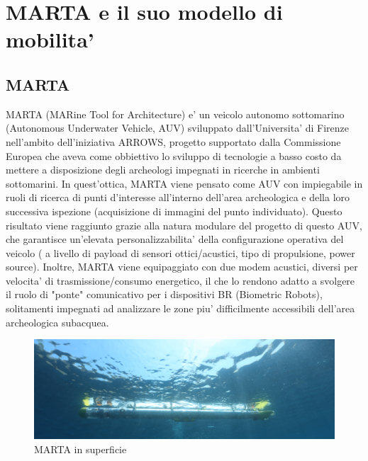 \chapter{MARTA e il suo modello di mobilita'}

\section{MARTA}

MARTA (MARine Tool for Architecture) e' un veicolo autonomo sottomarino (Autonomous Underwater Vehicle, AUV) sviluppato dall'Universita' di Firenze nell'ambito dell'iniziativa ARROWS, progetto supportato dalla Commissione Europea che aveva come obbiettivo lo sviluppo di tecnologie a basso costo da mettere a disposizione degli archeologi impegnati in ricerche in ambienti sottomarini. \newline
In quest'ottica, MARTA viene pensato come AUV con impiegabile in ruoli di ricerca di punti d'interesse all'interno dell'area archeologica e della loro successiva ispezione (acquisizione di immagini del punto individuato). \newline
Questo risultato viene raggiunto grazie alla natura modulare del progetto di questo AUV, che garantisce un'elevata personalizzabilita' della configurazione operativa del veicolo ( a livello di payload di sensori ottici/acustici, tipo di propulsione, power source). \newline
Inoltre, MARTA viene equipaggiato con due modem acustici, diversi per velocita' di trasmissione/consumo energetico, il che lo rendono adatto a svolgere il ruolo di "ponte" comunicativo per i dispositivi BR (Biometric Robots), solitamenti impegnati ad analizzare le zone piu' difficilmente accessibili dell'area archeologica subacquea.

\begin{figure}[H]
	\includegraphics[width=\linewidth]{MARTA.png}
	\caption{MARTA in superficie}
	\label{fig:MARTA}
	\centering
\end{figure}

